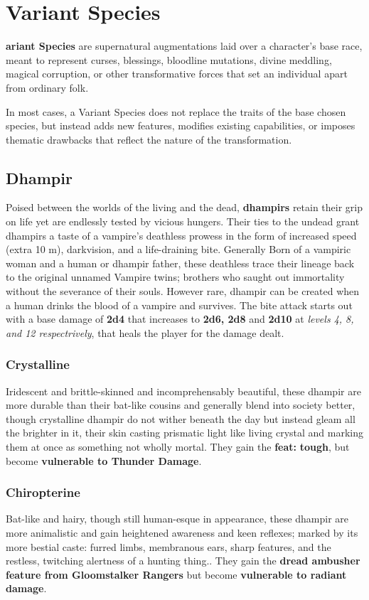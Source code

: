 \documentclass[letterpaper,twocolumn,openany,nodeprecatedcode,breakable,skins,xparse,most]{dndbook}
\begin{document}
\newpage

\section{Variant Species}
\textbf{ariant Species} are supernatural augmentations laid over a character’s base race, meant to represent curses, blessings, bloodline mutations, divine meddling, magical corruption, or other transformative forces that set an individual apart from ordinary folk.

In most cases, a Variant Species does not replace the traits of the base chosen species, but instead adds new features, modifies existing capabilities, or imposes thematic drawbacks that reflect the nature of the transformation.

\subsection{Dhampir}
Poised between the worlds of the living and the dead, \textbf{dhampirs} retain their grip on life yet are endlessly tested by vicious hungers. Their ties to the undead grant dhampirs a taste of a vampire’s deathless prowess in the form of increased speed (extra 10 m), darkvision, and a life-draining bite. Generally Born of a vampiric woman and a human or dhampir father, these deathless trace their lineage back to the original unnamed Vampire twins; brothers who saught out immortality without the severance of their souls. However rare, dhampir can be created when a human drinks the blood of a vampire and survives. The bite attack starts out with a base damage of \textbf{2d4} that increases to \textbf{2d6, 2d8} and \textbf{2d10} at \textit{levels 4, 8, and 12 respectrively}, that heals the player for the damage dealt.

\subsubsection{Crystalline}
Iridescent and brittle-skinned and incomprehensably beautiful, these dhampir are more durable than their bat-like cousins and generally blend into society better, though crystalline dhampir do not wither beneath the day but instead gleam all the brighter in it, their skin casting prismatic light like living crystal and marking them at once as something not wholly mortal. They gain the \textbf{feat: }\textbf{tough}, but become \textbf{vulnerable to Thunder Damage}.

\subsubsection{Chiropterine}
Bat-like and hairy, though still human-esque in appearance, these dhampir are more animalistic and gain heightened awareness and keen reflexes; marked by its more bestial caste: furred limbs, membranous ears, sharp features, and the restless, twitching alertness of a hunting thing.. They gain the \textbf{dread ambusher feature from Gloomstalker Rangers} but become \textbf{vulnerable to radiant damage}.
\end{document}
